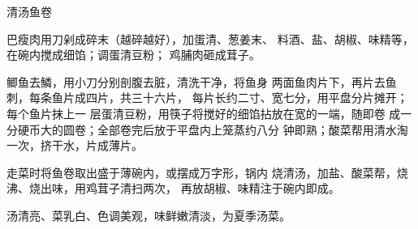 \begin{recipe}{清汤鱼卷}

\ingredients


\cooking

巴瘦肉用刀剁成碎末（越碎越好），加蛋清、葱姜末、 料酒、盐、胡椒、味精等，在碗内搅成细馅；调蛋清豆粉； 鸡脯肉砸成茸子。

\step 鲫鱼去鱗，用小刀分别剖腹去脏，清洗干净，将鱼身 两面鱼肉片下，再片去鱼刺，每条鱼片成四片，共三十六片， 每片长约二寸、宽七分，用平盘分片摊开；每个鱼片抹上一 层蛋清豆粉，用筷子将搅好的细馅拈放在宽的一端，随即卷 成一分硬币大的圆卷；全部卷完后放于平盘内上笼蒸约八分 钟即熟；酸菜帮用清水淘一次，挤干水，片成薄片。

\step 走菜时将鱼卷取出盛于薄碗内，或摆成万字形，锅内 烧清汤，加盐、酸菜帮，烧沸、烧出味，用鸡茸子清扫两次， 再放胡椒、味精注于碗内即成。

\notes

汤清亮、菜乳白、色调美观，味鲜嫩清淡，为夏季汤菜。

\end{recipe}

